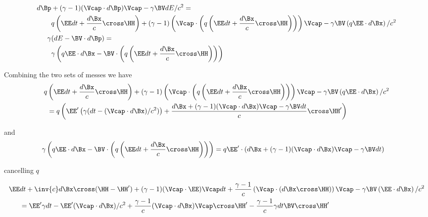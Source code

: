 \begin{equation}\label{eqn:lorentz_force_tx_2:60}
\begin{aligned}
d\Bp &+ (\gamma-1)(\Vcap \cdot d\Bp) \Vcap - \gamma \BV dE/c^2 = \\
&q \left( \EE dt + \frac{d\Bx}{c} \cross \HH \right) + (\gamma-1)\left(\Vcap \cdot \left(q \left( \EE dt + \frac{d\Bx}{c} \cross \HH \right)\right)\right) \Vcap - \gamma \BV \left( q \EE \cdot d\Bx \right)/c^2  \\
\gamma &( dE - \BV \cdot d\Bp ) = \\
&\gamma \left( q \EE \cdot d\Bx - \BV \cdot \left(q \left( \EE dt + \frac{d\Bx}{c} \cross \HH \right)\right) \right) 
\end{aligned}
\end{equation}

Combining the two sets of messes we have
\begin{equation}\label{eqn:lorentz_force_tx_2:80}
\begin{aligned}
q &\left( \EE dt + \frac{d\Bx}{c} \cross \HH \right) + (\gamma-1)\left(\Vcap \cdot \left(q \left( \EE dt + \frac{d\Bx}{c} \cross \HH \right)\right)\right) \Vcap - \gamma \BV \left( q \EE \cdot d\Bx \right)/c^2  \\
&=q \left( \EE' \left(\gamma ( dt - (\Vcap \cdot d\Bx )/c^2 )\right) + \frac{d\Bx + (\gamma-1)(\Vcap \cdot d\Bx) \Vcap - \gamma \BV dt}{c} \cross \HH' \right)  \\
\end{aligned}
\end{equation}

and
\begin{equation}\label{eqn:lorentz_force_tx_2:100}
\begin{aligned}
\gamma &\left( q \EE \cdot d\Bx - \BV \cdot \left(q \left( \EE dt + \frac{d\Bx}{c} \cross \HH \right)\right) \right) 
=
q \EE' \cdot \left(d\Bx + (\gamma-1)(\Vcap \cdot d\Bx) \Vcap - \gamma \BV dt\right)
\end{aligned}
\end{equation}

cancelling \(q\)

\begin{equation}\label{eqn:lorentz_force_tx_2:120}
\begin{aligned}
\EE &dt 
+ \inv{c} d\Bx \cross (\HH - \HH')
+ (\gamma-1)(\Vcap \cdot \EE) \Vcap dt 
+ \frac{\gamma-1}{c}\left(\Vcap \cdot \left( d\Bx \cross \HH \right)\right) \Vcap 
- \gamma \BV \left( \EE \cdot d\Bx \right)/c^2  \\
&=
\EE' \gamma dt 
-\EE' (\Vcap \cdot d\Bx )/c^2 
+ \frac{\gamma-1}{c} (\Vcap \cdot d\Bx) \Vcap \cross \HH' 
- \frac{\gamma-1}{c}\gamma dt \BV \cross \HH' 
\end{aligned}
\end{equation}

